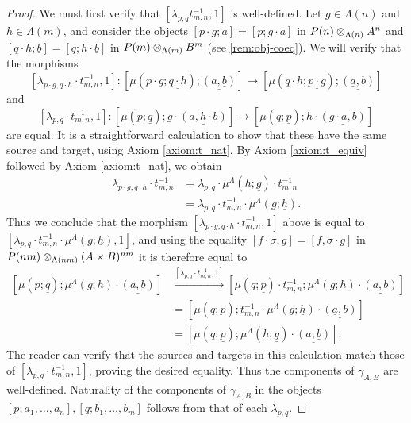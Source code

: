 \begin{proof}
We must first verify that $[\lambda_{p,q}t_{m,n}^{-1}, 1]$ is well-defined. Let $g \in \Lambda(n)$ and $h \in \Lambda(m)$, and consider the objects $[p \cdot g; \underline{a}] = [p; g \cdot \underline{a}]$ in $P(n) \otimes_{\Lambda(n)} A^{n}$ and $[q \cdot h; \underline{b}] = [q; h \cdot \underline{b}]$ in $P(m) \otimes_{\Lambda(m)} B^{m}$ (see \cref{rem:obj-coeq}). We will verify that the morphisms
\[
[\lambda_{p \cdot g, q \cdot h} \cdot t_{m,n}^{-1}, 1] \colon   \left[\mu\left(p \cdot g; \underline{q \cdot h}\right); \underline{(a, \underline{b})}\right] \to  \left[\mu\left(q \cdot h; \underline{p \cdot g}\right); \underline{(\underline{a},b)}\right]
\]
and
\[
[\lambda_{p, q} \cdot t_{m,n}^{-1}, 1] \colon   \left[\mu\left(p; \underline{q}\right); g \cdot \underline{(a, h \cdot \underline{ b})}\right] \to  \left[\mu\left(q; \underline{p}\right); h \cdot \underline{(g \cdot \underline{a},b)}\right]
\]
are equal.
It is a straightforward calculation to show that these have the same source and target, using Axiom \eqref{axiom:t_nat}. By Axiom \eqref{axiom:t_equiv} followed by Axiom \eqref{axiom:t_nat}, we obtain
\begin{align*}
\lambda_{p \cdot g, q \cdot h} \cdot t_{m,n}^{-1} & = \lambda_{p,q} \cdot \mu^{\Lambda}(h; \underline{g}) \cdot t_{m,n}^{-1} \\
& = \lambda_{p,q} \cdot t_{m,n}^{-1} \cdot \mu^{\Lambda}(g; \underline{h}).
\end{align*}
Thus we conclude that the morphism $[\lambda_{p \cdot g, q \cdot h} \cdot t_{m,n}^{-1}, 1]$ above is equal to $
[\lambda_{p,q} \cdot t_{m,n}^{-1} \cdot \mu^{\Lambda}(g; \underline{h}), 1]$, and using the equality $[f \cdot \sigma, g] = [f, \sigma \cdot g]$ in $P(nm) \otimes_{\Lambda(nm)} (A \times B)^{nm}$ it is therefore equal to
\begin{align*}
\left[\mu\left(p; \underline{q}\right); \mu^{\Lambda}(g; \underline{h}) \cdot \underline{(a, \underline{b})}\right] & \stackrel{[\lambda_{p,q} \cdot t_{m,n}^{-1}, 1]}{\longrightarrow}  \left[\mu\left(q; \underline{p}\right) \cdot t_{m,n}^{-1}; \mu^{\Lambda}(g; \underline{h})\cdot \underline{(\underline{a},b)}\right] \\
& = \left[\mu\left(q; \underline{p}\right); t_{m,n}^{-1} \cdot \mu^{\Lambda}(g; \underline{h})\cdot \underline{(\underline{a},b)}\right] \\
& =\left[\mu\left(q; \underline{p}\right); \mu^{\Lambda}(h; \underline{g})\cdot \underline{(a,\underline{b})}\right].
\end{align*}
The reader can verify that the sources and targets in this calculation match those of $[\lambda_{p, q} \cdot t_{m,n}^{-1}, 1]$, proving the desired equality. Thus the components of $\gamma_{A,B}$ are well-defined.
Naturality of the components of $\gamma_{A,B}$ in the objects $[p;a_1,\ldots,a_n],[q;b_1,\ldots,b_m]$ follows from that of each $\lambda_{p,q}$.  


\end{proof}
